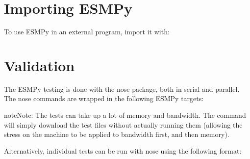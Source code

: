 \documentclass[letterpaper,10pt,english]{sphinxmanual}
\begin{document}
\section{Importing ESMPy}
\label{\detokenize{install:importing-esmpy}}
To use ESMPy in an external program, import it with:

\begin{sphinxVerbatim}[commandchars=\\\{\}]
 
\end{sphinxVerbatim}


\section{Validation}
\label{\detokenize{install:validation}}
The ESMPy testing is done with the nose package, both in serial and
parallel.  The nose commands are wrapped in the following ESMPy targets:

\begin{sphinxVerbatim}[commandchars=\\\{\}]
  

  

  

  

  

  
\end{sphinxVerbatim}

\begin{sphinxadmonition}{note}{Note:}
The  tests can take up a lot of memory and bandwidth.
The  command will simply download the test
files without actually running them (allowing the stress on the machine to
be applied to bandwidth first, and then memory).
\end{sphinxadmonition}

Alternatively, individual tests can be run with nose using the following format:
\end{document}
